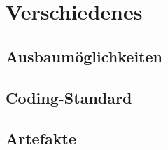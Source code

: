 \documentclass[../main.tex]{subfiles}
\begin{document}
	\section{Verschiedenes}
	
	\subsection{Ausbaumöglichkeiten}
	\subsection{Coding-Standard}
	\subsection{Artefakte}
\end{document}
